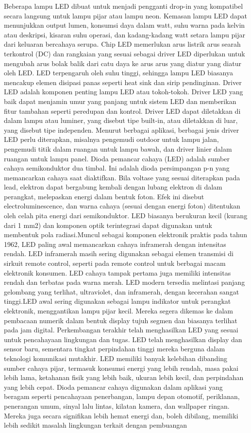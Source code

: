 Beberapa lampu LED dibuat untuk menjadi pengganti drop-in yang kompatibel secara langsung untuk lampu pijar atau lampu neon. Kemasan lampu LED dapat menunjukkan output lumen, konsumsi daya dalam watt, suhu warna pada kelvin atau deskripsi, kisaran suhu operasi, dan kadang-kadang watt setara lampu pijar dari keluaran bercahaya serupa. Chip LED memerlukan arus listrik arus searah terkontrol (DC) dan rangkaian yang sesuai sebagai driver LED diperlukan untuk mengubah arus bolak balik dari catu daya ke arus arus yang diatur yang diatur oleh LED. LED terpengaruh oleh suhu tinggi, sehingga lampu LED biasanya mencakup elemen disipasi panas seperti heat sink dan sirip pendinginan. Driver LED adalah komponen penting lampu LED atau tokoh-tokoh. Driver LED yang baik dapat menjamin umur yang panjang untuk sistem LED dan memberikan fitur tambahan seperti peredupan dan kontrol. Driver LED dapat diletakkan di dalam lampu atau luminer, yang disebut tipe built-in, atau diletakkan di luar, yang disebut tipe independen. Menurut berbagai aplikasi, berbagai jenis driver LED perlu diterapkan, misalnya pengemudi outdoor untuk lampu jalan, pengemudi titik dalam ruangan untuk lampu bawah, dan driver linier dalam ruangan untuk lampu panel. Dioda pemancar cahaya (LED) adalah sumber cahaya semikonduktor dua timbal. Ini adalah dioda persimpangan p-n yang memancarkan cahaya saat diaktifkan. Bila voltase yang sesuai diterapkan pada lead, elektron dapat bergabung kembali dengan lubang elektron di dalam perangkat, melepaskan energi dalam bentuk foton. Efek ini disebut electroluminescence, dan warna cahaya (sesuai dengan energi foton) ditentukan oleh celah pita energi dari semikonduktor. LED biasanya berukuran kecil (kurang dari 1 mm2) dan komponen optik terintegrasi dapat digunakan untuk membentuk pola radiasi.Muncul sebagai komponen elektronik praktis pada tahun 1962, LED paling awal memancarkan cahaya inframerah dengan intensitas rendah. LED inframerah masih sering digunakan sebagai elemen transmisi di sirkuit remote control, seperti pada remote control untuk berbagai macam elektronik konsumen. LED cahaya tampak pertama juga memiliki intensitas rendah dan terbatas pada warna merah. LED modern tersedia melintasi panjang gelombang yang terlihat, ultraviolet, dan inframerah, dengan kecerahan sangat tinggi.LED awal sering digunakan sebagai lampu indikator untuk perangkat elektronik, menggantikan lampu pijar kecil. Mereka segera dikemas ke dalam pembacaan numerik dalam bentuk display tujuh segmen dan biasanya terlihat pada jam digital. Perkembangan terakhir telah menghasilkan LED yang sesuai untuk pencahayaan lingkungan dan tugas. LED telah menghasilkan display dan sensor baru, sementara tingkat perpindahan tinggi mereka berguna dalam teknologi komunikasi mutakhir. LED memiliki banyak kelebihan dibanding sumber cahaya pijar, termasuk konsumsi energi yang lebih rendah, masa pakai lebih lama, ketahanan fisik yang lebih baik, ukuran lebih kecil, dan perpindahan yang lebih cepat. Dioda pemancar cahaya digunakan dalam aplikasi yang beragam seperti pencahayaan penerbangan, lampu depan otomotif, periklanan, penerangan umum, sinyal lalu lintas, kilatan kamera, dan wallpaper ringan. Mereka juga secara signifikan lebih hemat energi dan, boleh dibilang, memiliki lebih sedikit masalah lingkungan terkait dengan pembuangan 